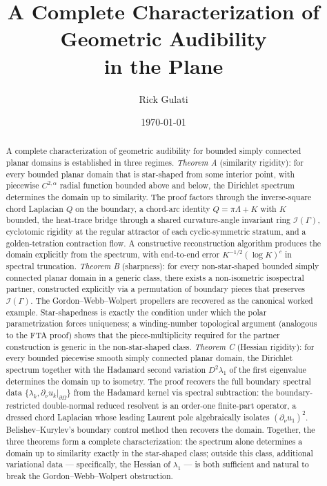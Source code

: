 \documentclass[11pt,reqno]{amsart}
\title[Complete characterization of geometric audibility]{A Complete Characterization of Geometric Audibility \\ in the Plane}
\author{Rick Gulati}
\date{\today}
\theoremstyle{plain}
\theoremstyle{definition}
\theoremstyle{remark}
\newcommand{\Qop}{Q}
\newcommand{\Lambdaop}{\Lambda}
\newcommand{\Icalbb}{\mathcal{I}}
\begin{document}
\begin{abstract}
A complete characterization of geometric audibility for bounded simply connected planar domains is established in three regimes. \emph{Theorem A} (similarity rigidity): for every bounded planar domain that is star-shaped from some interior point, with piecewise $C^{2,\alpha}$ radial function bounded above and below, the Dirichlet spectrum determines the domain up to similarity. The proof factors through the inverse-square chord Laplacian $\Qop$ on the boundary, a chord-arc identity $\Qop = \pi\Lambdaop + K$ with $K$ bounded, the heat-trace bridge through a shared curvature-angle invariant ring $\Icalbb(\Gamma)$, cyclotomic rigidity at the regular attractor of each cyclic-symmetric stratum, and a golden-tetration contraction flow. A constructive reconstruction algorithm produces the domain explicitly from the spectrum, with end-to-end error $K^{-1/2}(\log K)^c$ in spectral truncation. \emph{Theorem B} (sharpness): for every non-star-shaped bounded simply connected planar domain in a generic class, there exists a non-isometric isospectral partner, constructed explicitly via a permutation of boundary pieces that preserves $\Icalbb(\Gamma)$. The Gordon--Webb--Wolpert propellers \cite{GWW, BCDS} are recovered as the canonical worked example. Star-shapedness is exactly the condition under which the polar parametrization forces uniqueness; a winding-number topological argument (analogous to the FTA proof) shows that the piece-multiplicity required for the partner construction is generic in the non-star-shaped class. \emph{Theorem C} (Hessian rigidity): for every bounded piecewise smooth simply connected planar domain, the Dirichlet spectrum together with the Hadamard second variation $D^2\lambda_1$ of the first eigenvalue determines the domain up to isometry. The proof recovers the full boundary spectral data $\{\lambda_k, \partial_\nu u_k|_{\partial\Omega}\}$ from the Hadamard kernel via spectral subtraction: the boundary-restricted double-normal reduced resolvent is an order-one finite-part operator, a dressed chord Laplacian whose leading Laurent pole algebraically isolates $(\partial_\nu u_1)^2$. Belishev--Kurylev's boundary control method then recovers the domain. Together, the three theorems form a complete characterization: the spectrum alone determines a domain up to similarity exactly in the star-shaped class; outside this class, additional variational data — specifically, the Hessian of $\lambda_1$ — is both sufficient and natural to break the Gordon--Webb--Wolpert obstruction.
\end{abstract}
\end{document}
